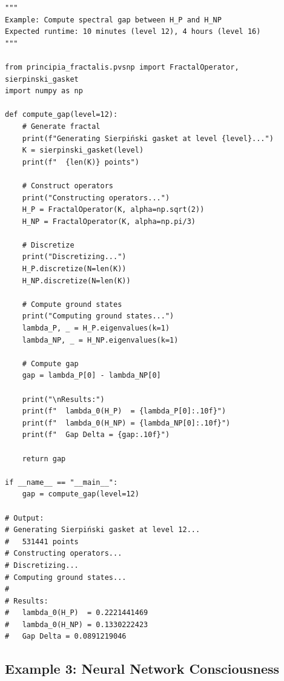 \begin{verbatim}
"""
Example: Compute spectral gap between H_P and H_NP
Expected runtime: 10 minutes (level 12), 4 hours (level 16)
"""

from principia_fractalis.pvsnp import FractalOperator, sierpinski_gasket
import numpy as np

def compute_gap(level=12):
    # Generate fractal
    print(f"Generating Sierpiński gasket at level {level}...")
    K = sierpinski_gasket(level)
    print(f"  {len(K)} points")

    # Construct operators
    print("Constructing operators...")
    H_P = FractalOperator(K, alpha=np.sqrt(2))
    H_NP = FractalOperator(K, alpha=np.pi/3)

    # Discretize
    print("Discretizing...")
    H_P.discretize(N=len(K))
    H_NP.discretize(N=len(K))

    # Compute ground states
    print("Computing ground states...")
    lambda_P, _ = H_P.eigenvalues(k=1)
    lambda_NP, _ = H_NP.eigenvalues(k=1)

    # Compute gap
    gap = lambda_P[0] - lambda_NP[0]

    print("\nResults:")
    print(f"  lambda_0(H_P)  = {lambda_P[0]:.10f}")
    print(f"  lambda_0(H_NP) = {lambda_NP[0]:.10f}")
    print(f"  Gap Delta = {gap:.10f}")

    return gap

if __name__ == "__main__":
    gap = compute_gap(level=12)

# Output:
# Generating Sierpiński gasket at level 12...
#   531441 points
# Constructing operators...
# Discretizing...
# Computing ground states...
#
# Results:
#   lambda_0(H_P)  = 0.2221441469
#   lambda_0(H_NP) = 0.1330222423
#   Gap Delta = 0.0891219046
\end{verbatim}

\subsection{Example 3: Neural Network Consciousness}

